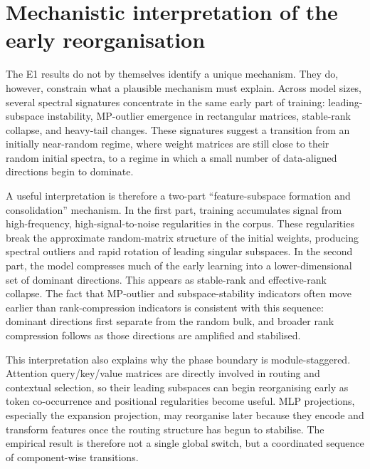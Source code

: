 
\section{Mechanistic interpretation of the early reorganisation}
\label{sec:mechanism-interpretation}

The E1 results do not by themselves identify a unique mechanism. They do, however, constrain what a plausible mechanism must explain. Across model sizes, several spectral signatures concentrate in the same early part of training: leading-subspace instability, MP-outlier emergence in rectangular matrices, stable-rank collapse, and heavy-tail changes. These signatures suggest a transition from an initially near-random regime, where weight matrices are still close to their random initial spectra, to a regime in which a small number of data-aligned directions begin to dominate.

A useful interpretation is therefore a two-part ``feature-subspace formation and consolidation'' mechanism. In the first part, training accumulates signal from high-frequency, high-signal-to-noise regularities in the corpus. These regularities break the approximate random-matrix structure of the initial weights, producing spectral outliers and rapid rotation of leading singular subspaces. In the second part, the model compresses much of the early learning into a lower-dimensional set of dominant directions. This appears as stable-rank and effective-rank collapse. The fact that MP-outlier and subspace-stability indicators often move earlier than rank-compression indicators is consistent with this sequence: dominant directions first separate from the random bulk, and broader rank compression follows as those directions are amplified and stabilised.

This interpretation also explains why the phase boundary is module-staggered. Attention query/key/value matrices are directly involved in routing and contextual selection, so their leading subspaces can begin reorganising early as token co-occurrence and positional regularities become useful. MLP projections, especially the expansion projection, may reorganise later because they encode and transform features once the routing structure has begun to stabilise. The empirical result is therefore not a single global switch, but a coordinated sequence of component-wise transitions.


